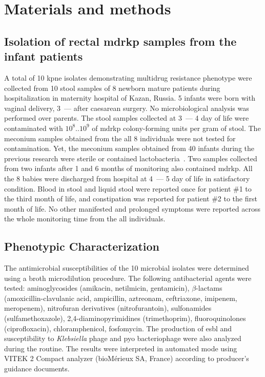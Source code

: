 \documentclass[12pt,a4paper]{article}
\newcommand{\betalactam}{$\beta$-lactam}
\begin{document}
\section{Materials and methods}\label{sec:mat_met}
\subsection{Isolation of rectal \gls{mdrkp} samples from the infant patients}\label{subsec:iso}
A total of 10 \gls{kpne} isolates demonstrating multidrug resistance phenotype were collected from 10
stool samples of 8 newborn mature patients during hospitalization in maternity hospital of Kazan, Russia.
5 infants were born with vaginal delivery, 3~--- after caesarean surgery.
No microbiological analysis was performed over parents.
The stool samples collected at 3~--- 4 day of life were contaminated with $10^8$..$10^9$ of \gls{mdrkp}
colony-forming units per gram of stool.
The meconium samples obtained from the all 8 individuals were not tested for contamination.
Yet, the meconium samples obtained from 40 infants during the previous research were sterile or
contained lactobacteria~\cite{Nikolaeva2019a}.
Two samples collected from two infants after 1 and 6 months of monitoring also contained \gls{mdrkp}.
All the 8 babies were discharged from hospital at 4~--- 5 day of life in satisfactory condition.
Blood in stool and liquid stool were reported once for patient \#1 to the third month of life,
and constipation was reported for patient \#2 to the first month of life.
No other manifested and prolonged symptoms were reported across the whole monitoring time from the all individuals.

\subsection{Phenotypic Characterization}\label{subsec:phe}
The antimicrobial susceptibilities of the 10 microbial isolates were determined using a broth microdilution procedure.
The following antibacterial agents were tested: aminoglycosides (amikacin, netilmicin, gentamicin),
\betalactam s (amoxicillin-clavulanic acid, ampicillin, aztreonam, ceftriaxone, imipenem, meropenem),
nitrofuran derivatives (nitrofurantoin), sulfonamides (sulfamethoxazole), 2,4-diaminopyrimidines (trimethoprim),
fluoroquinolones (ciprofloxacin), chloramphenicol, fosfomycin.
The production of \gls{esbl} and susceptibility to \textit{Klebsiella} phage and pyo bacteriophage
were also analyzed during the routine.
The results were interpreted in automated mode using VITEK 2 Compact analyzer (bioMérieux SA, France) according to
producer's guidance documents.
\end{document}
